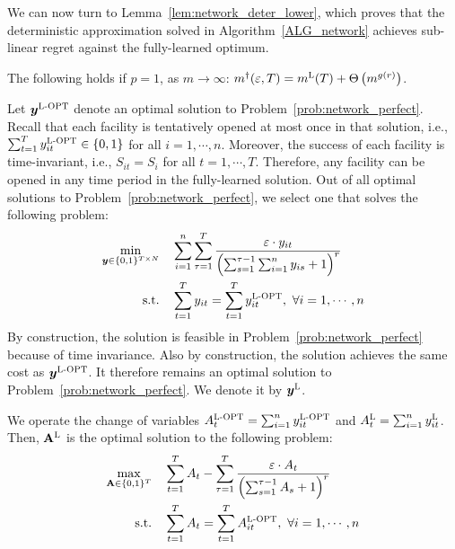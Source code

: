 \documentclass[nonblindrev]{informs3noheader}
\def\by{\boldsymbol{y}}
\def\st{\text{s.t.}}
\begin{document}
We can now turn to Lemma~\ref{lem:network_deter_lower}, which proves that the deterministic approximation solved in Algorithm~\ref{ALG_network} achieves sub-linear regret against the fully-learned optimum.

\begin{lemma}\label{lem:network_deter_lower}
   The following holds if $p=1$, as $m\to\infty$: $m^\dagger(\varepsilon, T) =  m^{\textsc{L}}(T) + \Theta\left(m^{g(r)}\right)$.
\end{lemma}

Let $\by^{\textsc{L-OPT}}$ denote an optimal solution to Problem~\eqref{prob:network_perfect}. Recall that each facility is tentatively opened at most once in that solution, i.e., $\sum_{t=1}^T{y}^{\textsc{L-OPT}}_{it}\in\{0,1\}$ for all $i=1,\cdots,n$. Moreover, the success of each facility is time-invariant, i.e., $S_{it}=S_i$ for all $t=1,\cdots,T$. Therefore, any facility can be opened in any time period in the fully-learned solution. Out of all optimal solutions to Problem~\eqref{prob:network_perfect}, we select one that solves the following problem:
\begin{align*}
    \min_{\by\in\{0,1\}^{T \times N}} \quad & \sum_{i=1}^n\sum_{\tau=1}^T\frac{\varepsilon\cdot y_{it}}{\left(\sum_{s=1}^{\tau-1}\sum_{i=1}^n y_{is}+1\right)^r} \nonumber\\
    \st\quad& \sum_{t=1}^Ty_{it}=\sum_{t=1}^T{y}^{\textsc{L-OPT}}_{it},\ \forall i=1,\cdots,n\nonumber
\end{align*}
By construction, the solution is feasible in Problem~\eqref{prob:network_perfect} because of time invariance. Also by construction, the solution achieves the same cost as $\by^{\textsc{L-OPT}}$. It therefore remains an optimal solution to Problem~\eqref{prob:network_perfect}. We denote it by $\by^{\textsc{L}}$.

We operate the change of variables $A^{\textsc{L-OPT}}_t = \sum_{i=1}^ny^{\textsc{L-OPT}}_{it}$ and $A^{\textsc{L}}_t = \sum_{i=1}^n y^{\textsc{L}}_{it}$. Then, $\mathbf{A}^{\textsc{L}}$ is the optimal solution to the following problem:
\begin{align}
    \max_{\mathbf{A}\in\{0,1\}^T} \quad & \sum_{t=1}^TA_t- \sum_{\tau=1}^T\frac{\varepsilon\cdot A_t}{\left(\sum_{s=1}^{\tau-1}A_s+1\right)^r} \label{prob:network_perfect_ties} \nonumber\\
    \st\quad& \sum_{t=1}^TA_t=\sum_{t=1}^T A^{\textsc{L-OPT}}_{it},\ \forall i=1,\cdots,n\nonumber
\end{align}
\end{document}
